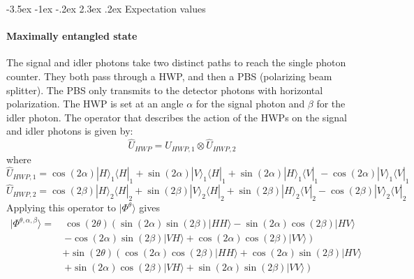 \documentclass[a4paper, 12pt,oneside]{article}
\makeatletter
\renewcommand{\subsection}{\@startsection {subsection}{1}{\z@}%
             {-3.5ex \@plus -1ex \@minus -.2ex}%
             {2.3ex \@plus.2ex}%
             {\normalfont\normalsize\bfseries}}
\makeatother
\begin{document}
\subsection{Expectation values}

\paragraph{Maximally entangled state}

The signal and idler photons take two distinct paths to reach the single photon counter. They both pass through a HWP, and then a PBS (polarizing beam splitter). The PBS only transmits to the detector photons with horizontal polarization. The HWP is set at an angle $\alpha$ for the signal photon and $\beta$ for the idler photon. The operator that describes the action of the HWPs on the signal and idler photons is given by:
\begin{equation}
    \label{eq:U_HWP}
    \hat{U}_{HWP} = \hat{U}_{HWP,1} \otimes \hat{U}_{HWP,2}
\end{equation}
where
\begin{equation}
    \hat{U}_{HWP,1} = \cos(2\alpha) |H\rangle_1 \langle H|_1 + \sin(2\alpha) |V\rangle_1 \langle H|_1 + \sin(2\alpha) |H\rangle_1 \langle V|_1 - \cos(2\alpha) |V\rangle_1 \langle V|_1
\end{equation}
\begin{equation}
    \hat{U}_{HWP,2} = \cos(2\beta) |H\rangle_2 \langle H|_2 + \sin(2\beta) |V\rangle_2 \langle H|_2 + \sin(2\beta) |H\rangle_2 \langle V|_2 - \cos(2\beta) |V\rangle_2 \langle V|_2
\end{equation}
Applying this operator to $|\Phi^\theta\rangle$ gives 
\begin{equation}
    \begin{aligned}
    |\Phi^{\theta, \alpha, \beta}\rangle = &\ \cos(2\theta) \left( \sin(2\alpha)\sin(2\beta) |HH\rangle - \sin(2\alpha)\cos(2\beta) |HV\rangle \right. \\
    &\ \left. - \cos(2\alpha)\sin(2\beta) |VH\rangle + \cos(2\alpha)\cos(2\beta) |VV\rangle \right) \\
    &+ \sin(2\theta) \left( \cos(2\alpha)\cos(2\beta) |HH\rangle + \cos(2\alpha)\sin(2\beta) |HV\rangle \right. \\
    &\ \left. + \sin(2\alpha)\cos(2\beta) |VH\rangle + \sin(2\alpha)\sin(2\beta) |VV\rangle \right)
    \end{aligned}
\end{equation}
\end{document}
